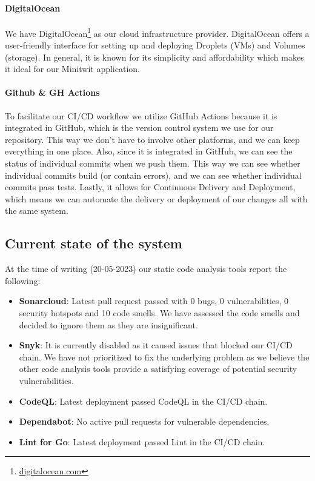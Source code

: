 \paragraph*{DigitalOcean}
We have DigitalOcean\footnote{\href{https://www.digitalocean.com/}{digitalocean.com}} as our cloud infrastructure provider. DigitalOcean offers a user-friendly interface for setting up and deploying Droplets (VMs) and Volumes (storage). In general, it is known for its simplicity and affordability which makes it ideal for our Minitwit application.

\paragraph*{Github \& GH Actions}
To facilitate our CI/CD workflow we utilize GitHub Actions because it is integrated in GitHub, which is the version control system we use for our repository. This way we don't have to involve other platforms, and we can keep everything in one place. Also, since it is integrated in GitHub, we can see the status of individual commits when we push them. This way we can see whether individual commits build (or contain errors), and we can see whether individual commits pass tests. Lastly, it allows for Continuous Delivery and Deployment, which means we can automate the delivery or deployment of our changes all with the same system.

\subsection{Current state of the system}
At the time of writing (20-05-2023) our static code analysis tools report the following:
\begin{itemize}
    \item \textbf{Sonarcloud}: Latest pull request passed with 0 bugs, 0 vulnerabilities, 0 security hotspots and 10 code smells. We have assessed the code smells and decided to ignore them as they are insignificant.
    \item \textbf{Snyk}: It is currently disabled as it caused issues that blocked our CI/CD chain. We have not prioritized to fix the underlying problem as we believe the other code analysis tools provide a satisfying coverage of potential security vulnerabilities.
    \item \textbf{CodeQL}: Latest deployment passed CodeQL in the CI/CD chain.
    \item \textbf{Dependabot}: No active pull requests for vulnerable dependencies.
    \item \textbf{Lint for Go}: Latest deployment passed Lint in the CI/CD chain.
\end{itemize}

